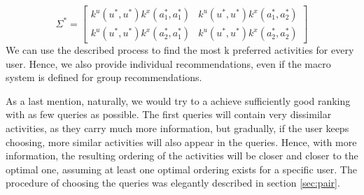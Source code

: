 \documentclass[11pt,a4paper,oneside]{article}
\begin{document}
\begin{equation}
     \Sigma^* = \begin{bmatrix}
   k^u(u^*,u^*)k^x(a^*_1, a^*_1) &
   k^u(u^*,u^*)k^x(a^*_1, a^*_2) \\
   k^u(u^*,u^*)k^x(a^*_2, a^*_1) &
   k^u(u^*,u^*)k^x(a^*_2, a^*_2) 
   \end{bmatrix}
\end{equation}
We can use the described process to find the most k preferred activities for every user. Hence, we also provide individual recommendations, even if the macro system is defined for group recommendations. 

As a last mention, naturally, we would try to a achieve sufficiently good ranking with as few queries as possible. The first queries will contain very dissimilar activities, as they carry much more information, but gradually, if the user keeps choosing, more similar activities will also appear in the queries. Hence, with more information, the resulting ordering of the activities will be closer and closer to the optimal one, assuming at least one optimal ordering exists for a specific user. The procedure of choosing the queries was elegantly described in section \ref{sec:pair}.
\end{document}
